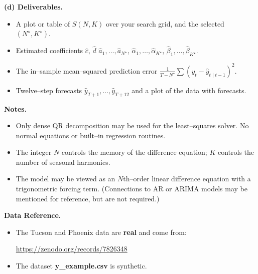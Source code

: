 \begin{problem}
\medskip
\textbf{(d) Deliverables.}
\begin{itemize}
  \item A plot or table of $S(N,K)$ over your search grid, and the selected
        $(N^\star,K^\star)$.
  \item Estimated coefficients
        $\hat c$, $\hat d$ $\hat a_1,\dots,\hat a_{N^\star}$,
        $\hat\alpha_1,\dots,\hat\alpha_{K^\star}$,
        $\hat\beta_1,\dots,\hat\beta_{K^\star}$.
  \item The in--sample mean--squared prediction error
        $\frac{1}{T-N^\star}\sum (y_t-\widehat y_{t\mid t-1})^2$.
  \item Twelve--step forecasts
        $\widehat y_{T+1},\dots,\widehat y_{T+12}$ and a plot of the data with forecasts.
\end{itemize}

\medskip
\textbf{Notes.}
\begin{itemize}
  \item Only dense QR decomposition may be used for the least--squares solver.
        No normal equations or built--in regression routines.
  \item The integer $N$ controls the memory of the difference equation;
        $K$ controls the number of seasonal harmonics.
  \item The model may be viewed as an $N$th--order linear difference equation
        with a trigonometric forcing term.
        (Connections to AR or ARIMA models may be mentioned for reference,
        but are not required.)
\end{itemize}
\end{problem}

\medskip
\textbf{Data Reference.}
\begin{itemize}
\item The Tucson and Phoenix data are \textbf{real} and come from:
  \begin{center}
    \url{https://zenodo.org/records/7826348}
  \end{center}
\item The dataset \textbf{y\_example.csv} is synthetic.
\end{itemize}
